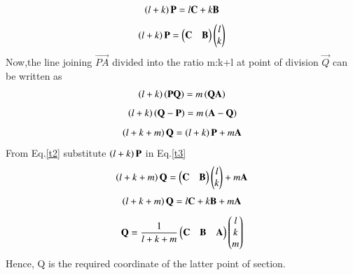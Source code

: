 \documentclass[journal,12pt,twocolumn]{IEEEtran}
\begin{document}
\begin{align}
    \left(l+k\right)\mathbf{P}=l\mathbf{C}+k\mathbf{B}
\end{align}
\begin{align}
    \left(l+k\right)\mathbf{P}=\begin{pmatrix}\mathbf{C} & \mathbf{B}\end{pmatrix}\begin{pmatrix}l\\k\end{pmatrix}\label{t2}
\end{align}
Now,the line joining $\vec{PA}$ divided into the ratio m:k+l at point of division $\vec{Q}$ can be written as
\begin{align}
    \left(l+k\right)\left(\mathbf{PQ}\right)=m\left(\mathbf{QA}\right)
\end{align}
\begin{align}
    \left(l+k\right)\left(\mathbf{Q-P}\right)=m\left(\mathbf{A-Q}\right)
\end{align}
\begin{align}
    \left(l+k+m\right)\mathbf{Q}=\left(l+k\right)\mathbf{P}+m\mathbf{A}\label{t3}
\end{align}
From Eq.\ref{t2} substitute $\left(l+k\right)\mathbf{P}$ in Eq.\ref{t3}
\begin{align}
    \left(l+k+m\right)\mathbf{Q}=\begin{pmatrix}\mathbf{C} & \mathbf{B}\end{pmatrix}\begin{pmatrix}l\\k\end{pmatrix}+m\mathbf{A}
\end{align}
\begin{align}
    \left(l+k+m\right)\mathbf{Q}=l\mathbf{C}+k\mathbf{B}+m\mathbf{A}
\end{align}
\begin{align}
    \mathbf{Q}=\frac{1}{l+k+m}\begin{pmatrix}\mathbf{C} & \mathbf{B} & \mathbf{A}\end{pmatrix}\begin{pmatrix}l\\k\\m\end{pmatrix}
\end{align}
Hence, Q is the required coordinate of the latter point of section.
\end{document}
